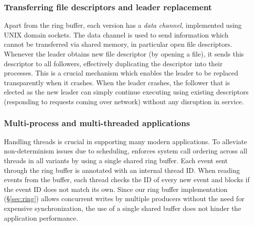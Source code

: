 \subsubsection{Transferring file descriptors and leader replacement}
\label{sec:leader-repl}

Apart from the ring buffer, each version has a \textit{data channel},
implemented using UNIX domain sockets.
The data channel is used to send information which cannot be
transferred via shared memory, in particular open file descriptors.
Whenever the leader obtains new file descriptor (\eg by opening a
file), it sends this descriptor to all followers, effectively
duplicating the descriptor into their processes. This is a crucial
mechanism which enables the leader to be replaced transparently when
it crashes. When the leader crashes, the follower that is elected as
the new leader can simply continue executing using existing
descriptors (\eg responding to requests coming over network) without
any disruption in service.



\subsubsection{Multi-process and multi-threaded applications}
\label{sec:threading}

Handling threads is crucial in supporting many modern applications. To
alleviate non-determinism issues due to scheduling, \vx enforces
system call ordering across all threads in all variants by using a
single shared ring buffer.  Each event sent through the ring buffer is
annotated with an internal thread ID. When reading events from the buffer, each
thread checks the ID of every new event and blocks if the event ID does not
match its own.  Since our ring buffer implementation (\S\ref{sec:ring}) allows
concurrent writes by multiple producers without the need for expensive
synchronization, the use of a single shared buffer does not hinder the
application performance. 

